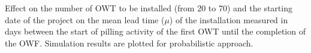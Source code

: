\label{fig:effectnumber}
Effect on the number of OWT to be installed (from 20 to 70) and the starting date of the project on the mean lead time ($\mu$) of the installation measured in days between the start of pilling activity of the first OWT until the completion of the OWF. Simulation results are plotted for probabilistic approach.